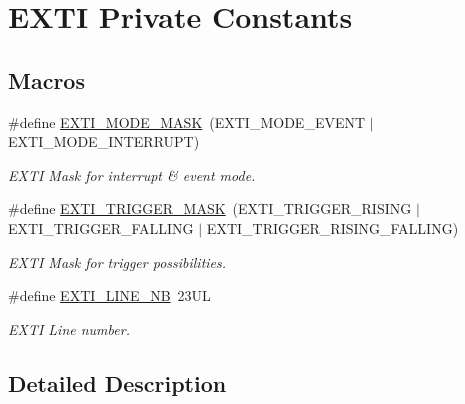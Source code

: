 \hypertarget{group___e_x_t_i___private___constants}{}\section{E\+X\+TI Private Constants}
\label{group___e_x_t_i___private___constants}
\subsection*{Macros}
\begin{DoxyCompactItemize}
\item 
\mbox{\label{group___e_x_t_i___private___constants_ga657f081646b552ee10bdfc7af94b5cdf}} 
\#define \hyperlink{group___e_x_t_i___private___constants_ga657f081646b552ee10bdfc7af94b5cdf}{E\+X\+T\+I\+\_\+\+M\+O\+D\+E\+\_\+\+M\+A\+SK}~(E\+X\+T\+I\+\_\+\+M\+O\+D\+E\+\_\+\+E\+V\+E\+NT $\vert$ E\+X\+T\+I\+\_\+\+M\+O\+D\+E\+\_\+\+I\+N\+T\+E\+R\+R\+U\+PT)
\begin{DoxyCompactList}\small\item\em E\+X\+TI Mask for interrupt \& event mode. \end{DoxyCompactList}\item 
\mbox{\label{group___e_x_t_i___private___constants_ga3e14df666414849fd5a3907a96a2a892}} 
\#define \hyperlink{group___e_x_t_i___private___constants_ga3e14df666414849fd5a3907a96a2a892}{E\+X\+T\+I\+\_\+\+T\+R\+I\+G\+G\+E\+R\+\_\+\+M\+A\+SK}~(E\+X\+T\+I\+\_\+\+T\+R\+I\+G\+G\+E\+R\+\_\+\+R\+I\+S\+I\+NG $\vert$ E\+X\+T\+I\+\_\+\+T\+R\+I\+G\+G\+E\+R\+\_\+\+F\+A\+L\+L\+I\+NG $\vert$ E\+X\+T\+I\+\_\+\+T\+R\+I\+G\+G\+E\+R\+\_\+\+R\+I\+S\+I\+N\+G\+\_\+\+F\+A\+L\+L\+I\+NG)
\begin{DoxyCompactList}\small\item\em E\+X\+TI Mask for trigger possibilities. \end{DoxyCompactList}\item 
\mbox{\label{group___e_x_t_i___private___constants_ga577c4d3186ba6dd303761b23510595ef}} 
\#define \hyperlink{group___e_x_t_i___private___constants_ga577c4d3186ba6dd303761b23510595ef}{E\+X\+T\+I\+\_\+\+L\+I\+N\+E\+\_\+\+NB}~23\+UL
\begin{DoxyCompactList}\small\item\em E\+X\+TI Line number. \end{DoxyCompactList}\end{DoxyCompactItemize}


\subsection{Detailed Description}
